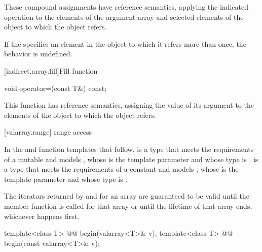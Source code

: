 \begin{itemdescr}
\pnum
These compound assignments have reference semantics, applying the indicated
operation to the elements of the argument array and selected elements of the
object to which the
object refers.

\pnum
If the
specifies an element in the
object to which it refers more than once,
the behavior is undefined.
\end{itemdescr}

[indirect.array.fill]{Fill function}

%
\begin{itemdecl}
void operator=(const T&) const;
\end{itemdecl}

\begin{itemdescr}
\pnum
This function has reference semantics, assigning the value of its argument
to the elements of the
object to which the
object refers.
\end{itemdescr}

[valarray.range]{ range access}

\pnum
In the  and  function templates that follow, 
is a type that meets the requirements of a mutable
and models ,
whose  is the template
parameter  and whose  type is .  is a
type that meets the requirements of a constant
and models ,
whose  is the template
parameter  and whose  type is .

\pnum
The iterators returned by  and  for an array
are guaranteed to be valid until the member function
 is called for that
array or until the lifetime of that array ends, whichever happens
first.

\begin{indexed}{}
\begin{itemdecl}
template<class T> @@ begin(valarray<T>& v);
template<class T> @@ begin(const valarray<T>& v);
\end{itemdecl}
\end{indexed}

